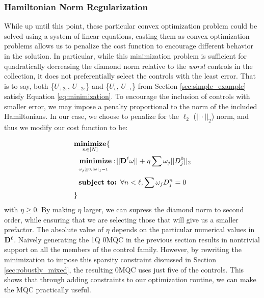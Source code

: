 \documentclass[aps,nofootinbib,pra,notitlepage,twocolumn]{revtex4-1}
\begin{document}


\subsubsection{Hamiltonian Norm Regularization}
\label{sec:norm}
While up until this point, these particular convex optimization problem could be solved using a system of linear equations, casting them as convex optimization problems allows us to penalize the cost function to encourage different behavior in the solution. In particular, while this minimization problem is sufficient for quadratically decreasing the diamond norm relative to the \textit{worst} controls in the collection, it does not preferentially select the controls with the least error. That is to say, both \{$U_{+2\epsilon}$, $U_{-2\epsilon}$\} and \{$U_{\epsilon}$, $U_{-\epsilon}$\} from Section \ref{sec:simple_example} satisfy Equation \ref{eq:minimization}. To encourage the inclusion of controls with smaller error, we may impose a penalty proportional to the norm of the included Hamiltonians. In our case, we choose to penalize for the $\ell_2$ ($||\cdot||_2$) norm, and thus we modify our cost function to be:

\newcommand{\bunderbrace}[2]{%
  \begin{array}[t]{@{}c@{}}
  #1\\
  \parbox{\widthof{#1}}{$\scriptscriptstyle#2$}
  \end{array}
}

\begin{equation}\label{eq:minimization_l2}
\begin{split}
&\underset{n\in[N]}{\textbf{minimize}}\{\\
&\ \ \bunderbrace{\textbf{minimize}: }{\omega_j\geq0, |\omega|_1=1} ||{\bold{D}^{\ell}}\omega||+ \eta\sum\omega_j||D^0_j||_2\\
&\ \ \textbf{subject to: } \forall n<\ell, \sum \omega_jD_j^n=0\\
&\}
\end{split}
\end{equation}
with $\eta \geq 0$. By making $\eta$ larger, we can supress the diamond norm to second order, while ensuring that we are selecting those that will give us a smaller prefactor. The absolute value of $\eta$ depends on the particular numerical values in $\bold{D}^\ell$. Naively generating the 1Q 0MQC in the previous section results in nontrivial support on all the members of the control family. However, by rewriting the minimization to impose this sparsity constraint discussed in Section \ref{sec:robustly_mixed}, the resulting 0MQC uses just five of the controls. This shows that through adding constraints to our optimization routine, we can make the MQC practically useful. 
\end{document}
